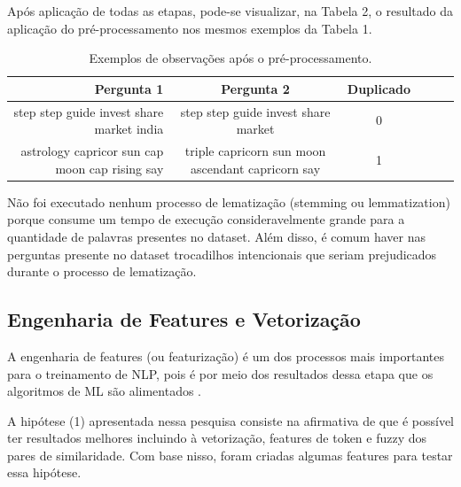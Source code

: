 \documentclass[conference]{IEEEtran}
\begin{document}
Após aplicação de todas as etapas, pode-se visualizar, na Tabela 2, o resultado da aplicação do pré-processamento nos mesmos exemplos da Tabela 1.

\begin{table}[]
\captionsetup{}
\caption{Exemplos de observações após o pré-processamento.} \label{tab:freq}
\setlength\tabcolsep{0pt} %
\footnotesize\centering

\smallskip 
\begin{tabular*}{\columnwidth}{@{\extracolsep{\fill}}rccccc}
\toprule
  Pergunta 1 & Pergunta 2 & Duplicado \\
\midrule
  \pbox{3cm}{step step guide invest share market india \\} &
  \pbox{3cm}{step step guide invest share market \\} &
  \pbox{3cm}{0\\} \\
  
  \pbox{3cm}{astrology capricor sun cap moon cap rising say \\} &
  \pbox{3cm}{triple capricorn sun moon ascendant capricorn say \\} &
  \pbox{3cm}{1\\} \\ \hline
\bottomrule
\end{tabular*}
\end{table}


Não foi executado nenhum processo de lematização (stemming ou lemmatization) porque consume um tempo de execução consideravelmente grande para a quantidade de palavras presentes no dataset. Além disso, é comum haver nas perguntas presente no dataset trocadilhos intencionais que seriam prejudicados durante o processo de lematização.

\subsection{Engenharia de Features e Vetorização}

A engenharia de features (ou featurização) é um dos processos mais importantes para o treinamento de NLP, pois é por meio dos resultados dessa etapa que os algoritmos de ML são alimentados \cite{Aroyehun2018}.

A hipótese (1) apresentada nessa pesquisa consiste na afirmativa de que é possível ter resultados melhores incluindo à vetorização, features de token e fuzzy dos pares de similaridade. Com base nisso, foram criadas algumas features para testar essa hipótese.
\end{document}
